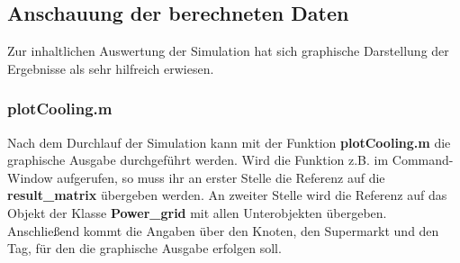 \subsection*{Anschauung der berechneten Daten}
Zur inhaltlichen Auswertung der Simulation hat sich graphische Darstellung der
Ergebnisse als sehr hilfreich erwiesen.

\subsubsection*{plotCooling.m}
Nach dem Durchlauf der Simulation kann mit der Funktion \textbf{plotCooling.m}
die graphische Ausgabe durchgef\"uhrt werden. Wird die Funktion z.B. im \matlab
Command-Window aufgerufen, so muss ihr an erster Stelle die Referenz auf die
\textbf{result\_matrix} \"ubergeben werden. An zweiter Stelle wird die Referenz auf das
Objekt der Klasse \textbf{Power\_grid} mit allen Unterobjekten \"ubergeben.
Anschlie\ss end kommt die Angaben \"uber den Knoten, den Supermarkt und den Tag,
f\"ur den die graphische Ausgabe erfolgen soll.
